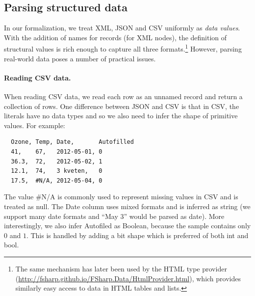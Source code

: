 \documentclass[10pt]{sigplanconf}
\newcommand{\kvd}[1]{\textnormal{\textcolor{kvdclr}{\sffamily #1}}}
\newcommand{\ident}[1]{\textnormal{\sffamily #1}}
\begin{document}
\subsection{Parsing structured data}
\label{sec:impl-parsing}

In our formalization, we treat XML, JSON and CSV uniformly as \emph{data values}. With the addition of
names for records (for XML nodes), the definition of structural values is rich enough to capture all
three formats.\footnote{The same mechanism has later been used by the HTML type provider
(\url{http://fsharp.github.io/FSharp.Data/HtmlProvider.html}), which provides similarly easy
access to data in HTML tables and lists.} However, parsing real-world data poses a number of practical issues.

\paragraph{Reading CSV data.}
When reading CSV data, we read each row as an unnamed record and return a collection of rows.
One difference between JSON and CSV is that in CSV, the literals have no data types and so
we also need to infer the shape of primitive values. For example:
%
{\small{
\begin{verbatim}
  Ozone, Temp, Date,       Autofilled
  41,    67,   2012-05-01, 0
  36.3,  72,   2012-05-02, 1
  12.1,  74,   3 kveten,   0
  17.5,  #N/A, 2012-05-04, 0
\end{verbatim}
}}
%
\noindent
The value {\small\ttfamily \#N/A} is commonly used to represent missing values in CSV and is treated
as \kvd{null}. The \ident{Date} column uses mixed formats and is inferred as \ident{string}
(we support many date formats and ``May 3'' would be parsed as date). More interestingly,
we also infer \ident{Autofiled} as Boolean, because the sample contains only $0$ and $1$.
This is handled by adding a \ident{bit} shape which is preferred of both \ident{int} and \ident{bool}.
\end{document}
